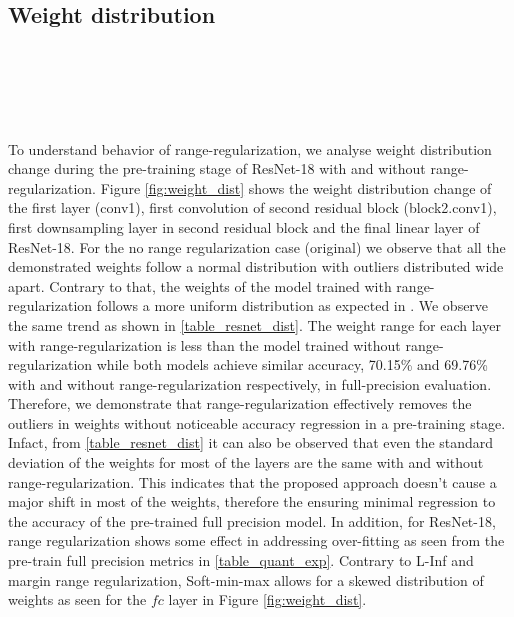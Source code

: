 \documentclass[10pt,twocolumn,letterpaper]{article}
\begin{document}
\subsection{Weight distribution}

\begin{figure*}[t]
\\
\\
\\
\\
\caption{Weight distribution of various layers of ResNet-18 during training time using no range regularization and the proposed methods. Final weight distributions of fc layer with R\_SMM $R^2$ loss regularizer shows that it can produce non-zero centered distributions.}
\label{fig:weight_dist}
\end{figure*}


To understand behavior of range-regularization, we analyse weight distribution change during the pre-training stage of ResNet-18 with and without range-regularization. Figure \ref{fig:weight_dist} shows the weight distribution change of the first layer (conv1), first convolution of second residual block (block2.conv1), first downsampling layer in second residual block and the final linear layer of ResNet-18. For the no range regularization case (original) we observe that all the demonstrated weights follow a normal distribution with outliers distributed wide apart. Contrary to that, the weights of the model trained with range-regularization follows a more uniform distribution as expected in \cite{kure}. We observe the same trend as shown in \cref{table_resnet_dist}. The weight range for each layer with range-regularization is less than the model trained without range-regularization while both models achieve similar accuracy, 70.15\% and 69.76\%  with and without range-regularization respectively, in full-precision evaluation. Therefore, we demonstrate that range-regularization effectively removes the outliers in weights without noticeable accuracy regression in a pre-training stage. Infact, from \cref{table_resnet_dist} it can also be observed that even the standard deviation of the weights for most of the layers are the same with and without range-regularization. This indicates that the proposed approach doesn't cause a major shift in most of the weights, therefore the ensuring minimal regression to the accuracy of the pre-trained full precision model. In addition, for ResNet-18, range regularization shows some effect in addressing over-fitting as seen from the pre-train full precision metrics in \cref{table_quant_exp}. Contrary to L-Inf and margin range regularization, Soft-min-max allows for a skewed distribution of weights as seen for the $fc$ layer in Figure \ref{fig:weight_dist}.
\end{document}

